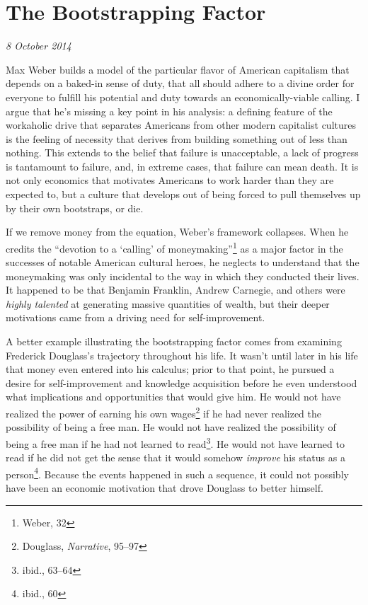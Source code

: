 \section{The Bootstrapping Factor}

\textit{8 October 2014}

Max Weber builds a model of the particular flavor of American capitalism that
depends on a baked-in sense of duty, that all should adhere to a divine order
for everyone to fulfill his potential and duty towards an economically-viable
calling. I argue that he's missing a key point in his analysis: a defining
feature of the workaholic drive that separates Americans from other modern
capitalist cultures is the feeling of necessity that derives from building
something out of less than nothing. This extends to the belief that failure is
unacceptable, a lack of progress is tantamount to failure, and, in extreme
cases, that failure can mean death. It is not only economics that motivates
Americans to work harder than they are expected to, but a culture that develops
out of being forced to pull themselves up by their own bootstraps, or die.

If we remove money from the equation, Weber's framework collapses. When
he credits the ``devotion to a `calling' of moneymaking''\footnote{Weber, 32} as
a major factor in the successes of notable American cultural heroes, he neglects
to understand that the moneymaking was only incidental to the way in which they
conducted their lives. It happened to be that Benjamin Franklin, Andrew
Carnegie, and others were \textit{highly talented} at generating massive
quantities of wealth, but their deeper motivations came from a driving need for
self-improvement.

A better example illustrating the bootstrapping factor comes from examining
Frederick Douglass's trajectory throughout his life. It wasn't until later in
his life that money even entered into his calculus; prior to that point, he
pursued a desire for self-improvement and knowledge acquisition before he even
understood what implications and opportunities that would give him. He would not
have realized the power of earning his own wages\footnote{Douglass,
\textit{Narrative}, 95--97} if he had never realized the possibility of being a
free man. He would not have realized the possibility of being a free man if he
had not learned to read\footnote{ibid., 63--64}. He would not have learned to
read if he did not get the sense that it would somehow \textit{improve} his
status as a person\footnote{ibid., 60}. Because the events happened in such a
sequence, it could not possibly have been an economic motivation that drove
Douglass to better himself.

